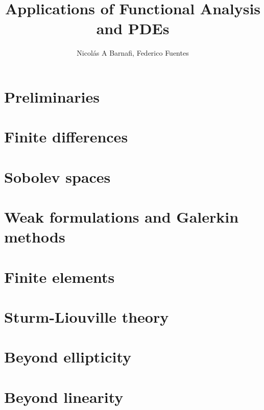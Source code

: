 \documentclass{scrbook}
\title{Applications of Functional Analysis and PDEs}
\author{Nicol\'as A Barnafi, Federico Fuentes}
\date{} %
\begin{document}
\maketitle
\tableofcontents
\mainmatter



\chapter{Preliminaries}\label{chapter:preliminaries}

\chapter{Finite differences}\label{chapter:finite-differences}

\chapter{Sobolev spaces}\label{chapter:sobolev}

\chapter{Weak formulations and Galerkin methods}\label{chapter:weak-forms-galerkin}

\chapter{Finite elements}\label{chapter:fem}

\chapter{Sturm-Liouville theory}\label{chapter:sturm-liouville}

\chapter{Beyond ellipticity}\label{chapter:beyond-ellipticity}

\chapter{Beyond linearity}\label{chapter:nonlinear}

\end{document}
